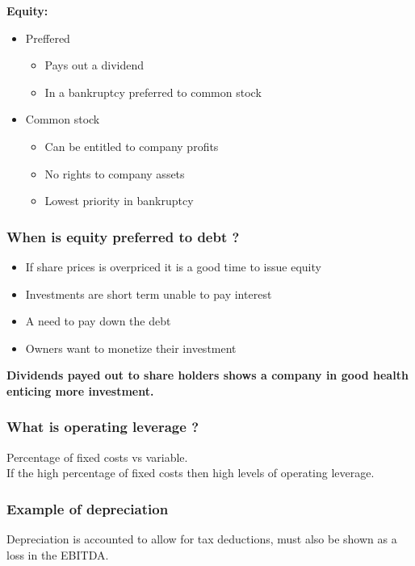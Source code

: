 \documentclass[11pt]{scrartcl} %
\begin{document}
\textbf{Equity:}

\begin{itemize}
	\item Preffered
	\begin{itemize}
		\item Pays out a dividend
		\item In a bankruptcy preferred to common stock
	\end{itemize}
	\item Common stock
	\begin{itemize}
		\item Can be entitled to company profits
		\item No rights to company assets
		\item Lowest priority in bankruptcy
	\end{itemize}
\end{itemize}

\subsubsection{When is equity preferred to debt ?}

\begin{itemize}
	\item If share prices is overpriced it is a good time to issue equity
	\item Investments are short term unable to pay interest
	\item A need to pay down the debt
	\item Owners want to monetize their investment
\end{itemize}

\textbf{Dividends payed out to share holders shows a company in good health enticing more investment.}

\subsubsection{What is operating leverage ?}

Percentage of fixed costs vs variable.\\

If the high percentage of fixed costs then high levels of operating leverage.

\subsubsection{Example of depreciation}

Depreciation is accounted to allow for tax deductions, must also be shown as a loss in the EBITDA.
\end{document}
